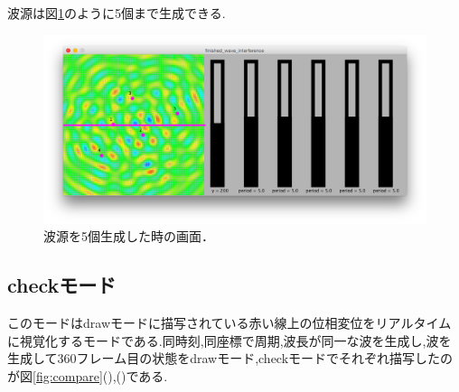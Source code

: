 波源は図\ref{fig:5wave}のように5個まで生成できる.

\begin{figure}[htbp]
 \begin{center}
  \includegraphics[width=\linewidth]{../result/5wave.png}
 \end{center}
 \caption{波源を5個生成した時の画面．}
 \label{fig:5wave}
\end{figure}

\newpage
\subsection{checkモード}
このモードはdrawモードに描写されている赤い線上の位相変位をリアルタイムに視覚化するモードである.同時刻,同座標で周期,波長が同一な波を生成し,波を生成して360フレーム目の状態をdrawモード,checkモードでそれぞれ描写したのが図\ref{fig:compare}(),()である.


